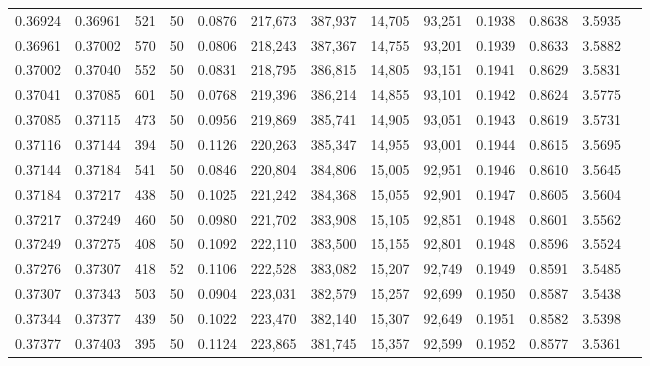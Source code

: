 \begin{tabular}{rrrrrrrrrrrrr}
0.36924 & 0.36961 &   521 &  50 &                                     0.0876 & 217,673 & 387,937 &  14,705 &  93,251 & 0.1938 & 0.8638 & 3.5935 \\
0.36961 & 0.37002 &   570 &  50 &                                     0.0806 & 218,243 & 387,367 &  14,755 &  93,201 & 0.1939 & 0.8633 & 3.5882 \\
0.37002 & 0.37040 &   552 &  50 &                                     0.0831 & 218,795 & 386,815 &  14,805 &  93,151 & 0.1941 & 0.8629 & 3.5831 \\
0.37041 & 0.37085 &   601 &  50 &                                     0.0768 & 219,396 & 386,214 &  14,855 &  93,101 & 0.1942 & 0.8624 & 3.5775 \\
0.37085 & 0.37115 &   473 &  50 &                                     0.0956 & 219,869 & 385,741 &  14,905 &  93,051 & 0.1943 & 0.8619 & 3.5731 \\
0.37116 & 0.37144 &   394 &  50 &                                     0.1126 & 220,263 & 385,347 &  14,955 &  93,001 & 0.1944 & 0.8615 & 3.5695 \\
0.37144 & 0.37184 &   541 &  50 &                                     0.0846 & 220,804 & 384,806 &  15,005 &  92,951 & 0.1946 & 0.8610 & 3.5645 \\
0.37184 & 0.37217 &   438 &  50 &                                     0.1025 & 221,242 & 384,368 &  15,055 &  92,901 & 0.1947 & 0.8605 & 3.5604 \\
0.37217 & 0.37249 &   460 &  50 &                                     0.0980 & 221,702 & 383,908 &  15,105 &  92,851 & 0.1948 & 0.8601 & 3.5562 \\
0.37249 & 0.37275 &   408 &  50 &                                     0.1092 & 222,110 & 383,500 &  15,155 &  92,801 & 0.1948 & 0.8596 & 3.5524 \\
0.37276 & 0.37307 &   418 &  52 &                                     0.1106 & 222,528 & 383,082 &  15,207 &  92,749 & 0.1949 & 0.8591 & 3.5485 \\
0.37307 & 0.37343 &   503 &  50 &                                     0.0904 & 223,031 & 382,579 &  15,257 &  92,699 & 0.1950 & 0.8587 & 3.5438 \\
0.37344 & 0.37377 &   439 &  50 &                                     0.1022 & 223,470 & 382,140 &  15,307 &  92,649 & 0.1951 & 0.8582 & 3.5398 \\
0.37377 & 0.37403 &   395 &  50 &                                     0.1124 & 223,865 & 381,745 &  15,357 &  92,599 & 0.1952 & 0.8577 & 3.5361 \\

\end{tabular}
